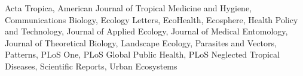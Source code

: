 
Acta Tropica, American Journal of Tropical Medicine and Hygiene, Communications Biology, Ecology Letters, EcoHealth, Ecosphere, Health Policy and Technology, Journal of Applied Ecology, Journal of Medical Entomology, Journal of Theoretical Biology, Landscape Ecology, Parasites and Vectors, Patterns, PLoS One, PLoS Global Public Health, PLoS Neglected Tropical Diseases, Scientific Reports, Urban Ecosystems



